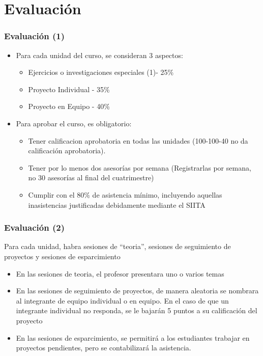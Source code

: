 \section{Evaluación}

\begin{frame}
\frametitle{Evaluación (1)}
\begin{itemize}
\item Para cada unidad del curso, se consideran 3 aspectos:
\begin{itemize}
\item Ejercicios o investigaciones especiales (1)- 25\%
\item Proyecto Individual  - 35\%
\item Proyecto en Equipo - 40\%
\end{itemize}
\item Para aprobar el curso, es obligatorio:
\begin{itemize} 
\item Tener calificacion aprobatoria en todas las unidades (100-100-40 no da calificación aprobatoria).
\item Tener por lo menos dos asesorías por semana (Registrarlas por semana, no 30 asesorías al final del cuatrimestre)
\item Cumplir con el 80\% de asistencia mínimo, incluyendo aquellas inasistencias justificadas debidamente mediante el SIITA
\end{itemize}
\end{itemize}
\end{frame}

\begin{frame}
\frametitle{Evaluación (2)}
Para cada unidad, habra sesiones de ``teoria'', sesiones de seguimiento de proyectos y sesiones de esparcimiento
\begin{itemize}
\item En las sesiones de teoria, el profesor presentara uno o varios temas
\item En las sesiones de seguimiento de proyectos, de manera aleatoria se nombrara al integrante de equipo individual o en equipo. En el caso de que un integrante individual no responda, se le bajarán 5 puntos a su calificación del proyecto
\item En las sesiones de esparcimiento, se permitirá a los estudiantes trabajar en proyectos pendientes, pero se contabilizará la asistencia. 
\end{itemize}
\end{frame}

